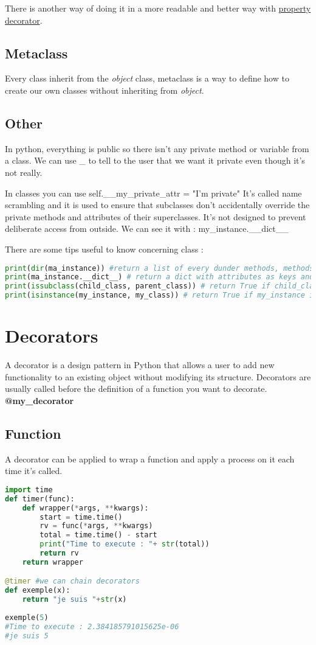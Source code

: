 \documentclass[a4paper, 12pt, titlepage]{scrartcl} %
\begin{document}
There is another way of doing it in a more readable and better way with \hyperref[subsec:Property]{property decorator}.

\subsection{Metaclass}
Every class inherit from the \textit{object} class, metaclass is a way to define how to create our own classes without inheriting from \textit{object}.

\subsection{Other}
In python, everything is public so there isn't any private method or variable from a class. We can use \_ to tell to the user that we want it private even though it's not really.

In classes you can use self.\_\_my\_private\_attr = "I'm private" 
It's called name scrambling and it is used to ensure that subclasses don't accidentally override the private methods and attributes of their superclasses. It's not designed to prevent deliberate access from outside. We can see it with : my\_instance.\_\_dict\_\_

There are some tips useful to know concerning class :
\begin{lstlisting}[language=Python]
print(dir(ma_instance)) #return a list of every dunder methods, methods and attributes from the class.
print(ma_instance.__dict__) # return a dict with attributes as keys and their value. associated.
print(issubclass(child_class, parent_class)) # return True if child_class is the child of parent_class.
print(isinstance(my_instance, my_class)) # return True if my_instance is an instance from my_class.
\end{lstlisting}

\newpage
\section{Decorators}
A decorator is a design pattern in Python that allows a user to add new functionality to an existing object without modifying its structure. Decorators are usually called before the definition of a function you want to decorate. \textbf{@my\_decorator}\newline
\subsection{Function}
A decorator can be applied to wrap a function and apply a process on it each time it's called.
\begin{lstlisting}[language=Python]
import time
def timer(func):
	def wrapper(*args, **kwargs):
		start = time.time()
		rv = func(*args, **kwargs)
		total = time.time() - start
		print("Time to execute : "+ str(total))
		return rv
	return wrapper

@timer #we can chain decorators
def exemple(x):
	return "je suis "+str(x)
	
exemple(5)
#Time to execute : 2.384185791015625e-06
#je suis 5
\end{lstlisting}
\end{document}
